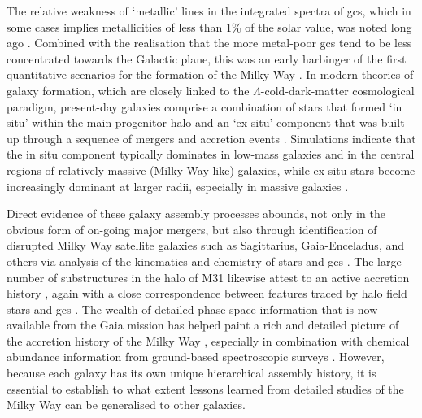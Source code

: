\documentclass{aa}
\begin{document}
The relative weakness of `metallic' lines in the integrated spectra of \acp{gc}, which
in some cases implies metallicities of less than 1\% of the solar value, was noted long ago \citep{Mayall1946,Morgan1956,Kinman1959}. Combined with the realisation that the more metal-poor \acp{gc} tend to be less concentrated towards the Galactic plane, this was an early harbinger of the first quantitative scenarios for the formation of the Milky Way \citep{Eggen1962,Searle1978}. In modern theories of galaxy formation, which are closely linked to the $\Lambda$-cold-dark-matter cosmological paradigm, 
present-day galaxies comprise a combination of stars that formed `in situ' within the main progenitor halo and an
`ex situ' component that was built up through a sequence of mergers and accretion events   \citep{Navarro1994,Cooper2010,Genel2014,Schaye2015}. Simulations indicate that the in situ component typically dominates in low-mass galaxies and in the central regions of relatively massive (Milky-Way-like) galaxies, while ex situ stars become increasingly dominant at larger radii, especially in massive galaxies \citep{Pillepich2015,Cook2016,Davison2021}.

Direct evidence of these galaxy assembly processes abounds, not only in the obvious form of on-going major mergers, but also through identification of disrupted Milky Way satellite galaxies such as Sagittarius, Gaia-Enceladus, and others via analysis of the kinematics and chemistry of stars and \acp{gc} \citep{Ibata1994,Helmi2018,Belokurov2018,Bergemann2018,Forbes2020,Kruijssen2020,Woody2021}.  
The large number of substructures in the halo of M31 likewise attest to an active accretion history \citep{Ibata2014,McConnachie2018}, again with a close correspondence between features traced by halo field stars and \acp{gc} \citep{Mackey2019a}.  
The wealth of detailed phase-space information that is now available from the Gaia mission has helped paint a rich and detailed picture of the accretion history of the Milky Way \citep{Malhan2018,Brown2021}, especially in combination with chemical abundance information from ground-based spectroscopic surveys \citep{Mackereth2019,Cordoni2021,Buder2021}.
However, because each galaxy has its own unique hierarchical assembly history, it is essential to establish to what extent lessons learned from detailed studies of the Milky Way can be generalised to other galaxies. 
\end{document}
